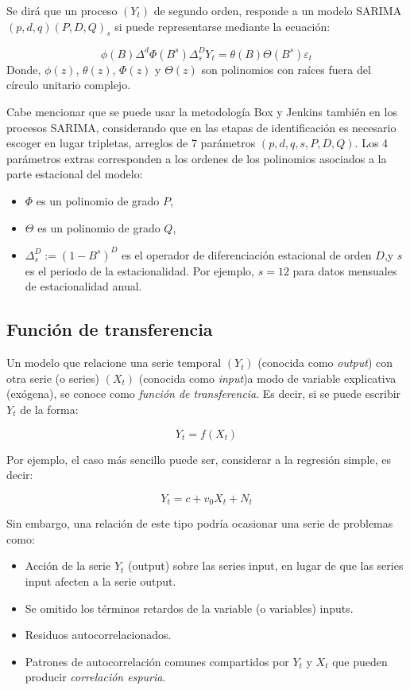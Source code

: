 \documentclass[12pt,oneside]{book}\usepackage[]{graphicx}\usepackage[]{color}
\theoremstyle{definition} %
\begin{document}
\begin{definicion}
Se dirá que un proceso $(Y_t)$ de segundo orden,  responde a un modelo SARIMA$(p,d,q)(P,D,Q)_s$ si puede representarse mediante la ecuación:

\begin{equation}
\phi  (B)\Delta^d \Phi (B^s) \Delta _s^DY_t = \theta  (B) \Theta (B^s)\varepsilon_t
\label{eq:sarima_def}
\end{equation}
Donde, $\phi (z)$, $\theta (z)$, $\Phi (z)$ y $\Theta (z)$ son polinomios con raíces fuera del círculo unitario complejo.

\end{definicion}

Cabe mencionar que se puede usar la metodología Box y Jenkins también en los procesos SARIMA, considerando que en las etapas de identificación es necesario escoger en lugar tripletas, arreglos de 7 parámetros $(p,d,q,s,P,D,Q)$. 
Los 4 parámetros extras corresponden a los ordenes de los polinomios asociados a la parte estacional del modelo: 

\begin{itemize}
\item $\Phi $ es un polinomio de grado $P$,
\item $\Theta $ es un polinomio de grado $Q$,
\item $\Delta _s^D:=(1-B^s)^D$ es el operador de diferenciación estacional de orden $D$,y $s$ es el periodo de la estacionalidad.  Por ejemplo, $s=12$ para datos mensuales de estacionalidad anual.
\end{itemize}


\subsection{Función de transferencia}

Un modelo que relacione una serie temporal $(Y_t)$ (conocida como \textit{output}) con otra serie (o series) $(X_t)$ (conocida como \textit{input})a modo de variable explicativa (exógena), se conoce como \textit{función de transferencia}. Es decir, si se puede escribir $Y_t$ de la forma:

$$Y_t= f(X_t)$$

Por ejemplo, el caso más sencillo puede ser, considerar a la regresión simple, es decir:

$$Y_t = c + v_0X_t + N_t$$

Sin embargo, una relación de este tipo podría ocasionar una serie de problemas como:
\begin{itemize}
\item Acción de la serie $Y_t$ (output) sobre las series input, en lugar de que las series input afecten a la serie output.
\item Se omitido los términos retardos de la variable (o variables) inputs.
\item Residuos autocorrelacionados.
\item Patrones de autocorrelación comunes compartidos por $Y_t$ y $X_t$ que pueden producir \textit{correlación espuria}.
\end{itemize}
\end{document}
